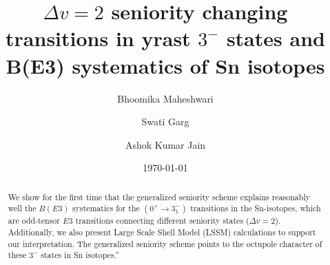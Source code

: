 \documentclass[twocolumn,showpacs,showkeys,preprintnumbers,amsmath,amssymb]{revtex4}
\begin{document}

\title{$\Delta v=2$ seniority changing transitions in yrast $3^-$ states and B(E3) systematics of Sn isotopes}%
\author{Bhoomika Maheshwari}
\author{Swati Garg}
\author{Ashok Kumar Jain}%
\date{\today}%

\begin{abstract}
We show for the first time that the generalized seniority scheme explains reasonably well the $B(E3)$ systematics for the $(0^+ \rightarrow 3_1^-)$ transitions in the Sn-isotopes, which are odd-tensor $E3$ transitions connecting different seniority states ($\Delta v = 2$). Additionally, we also present Large Scale Shell Model (LSSM) calculations to support our interpretation. The generalized seniority scheme points to the octupole character of these $3^-$ states in Sn isotopes.”
\end{abstract}

\maketitle
\end{document}
